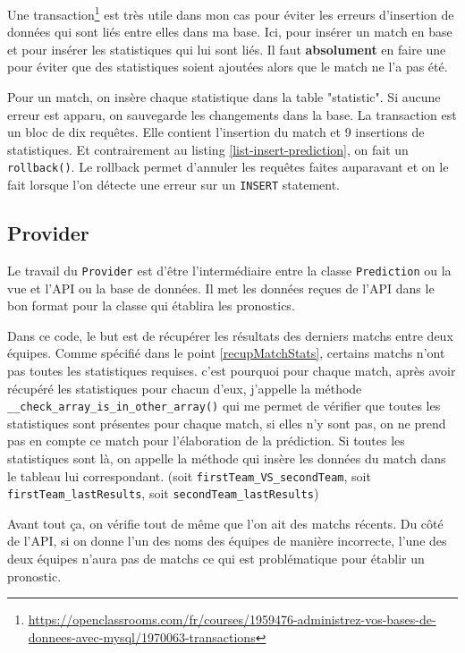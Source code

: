 \documentclass[a4paper,14pt]{extarticle}
\begin{document}
{Une transaction\footnote{\url{https://openclassrooms.com/fr/courses/1959476-administrez-vos-bases-de-donnees-avec-mysql/1970063-transactions}} est très utile dans mon cas pour éviter les erreurs d'insertion de données qui sont liés entre elles dans ma base. Ici, pour insérer un match en base et pour insérer les statistiques qui lui sont liés. Il faut \textbf{absolument} en faire une pour éviter que des statistiques soient ajoutées alors que le match ne l'a pas été.



Pour un match, on insère chaque statistique dans la table "statistic". Si aucune erreur est apparu, on sauvegarde les changements dans la base. La transaction est un bloc de dix requêtes. Elle contient l'insertion du match et 9 insertions de statistiques. Et contrairement au listing \ref{list-insert-prediction}, on fait un \texttt{rollback()}. Le rollback permet d'annuler les requêtes faites auparavant et on le fait lorsque l'on détecte une erreur sur un \texttt{INSERT} statement.

\subsection{Provider}

Le travail du \texttt{Provider} est d'être l'intermédiaire entre la classe \texttt{Prediction} ou la vue et l'API ou la base de données. Il met les données reçues de l'API dans le bon format pour la classe qui établira les pronostics. 


Dans ce code, le but est de récupérer les résultats des derniers matchs entre deux équipes. Comme spécifié dans le point \ref{recupMatchStats}, certains matchs n'ont pas toutes les statistiques requises. c'est pourquoi pour chaque match, après avoir récupéré les statistiques pour chacun d'eux, j'appelle la méthode \texttt{\_\_check\_array\_is\_in\_other\_array()} qui me permet de vérifier que toutes les statistiques sont présentes pour chaque match, si elles n'y sont pas, on ne prend pas en compte ce match pour l'élaboration de la prédiction. Si toutes les statistiques sont là, on appelle la méthode qui insère les données du match dans le tableau lui correspondant. (soit \texttt{firstTeam\_VS\_secondTeam}, soit \texttt{firstTeam\_lastResults}, soit \texttt{secondTeam\_lastResults})

Avant tout ça, on vérifie tout de même que l'on ait des matchs récents. Du côté de l'API, si on donne l'un des noms des équipes de manière incorrecte, l'une des deux équipes n'aura pas de matchs ce qui est problématique pour établir un pronostic. 

}
\end{document}
